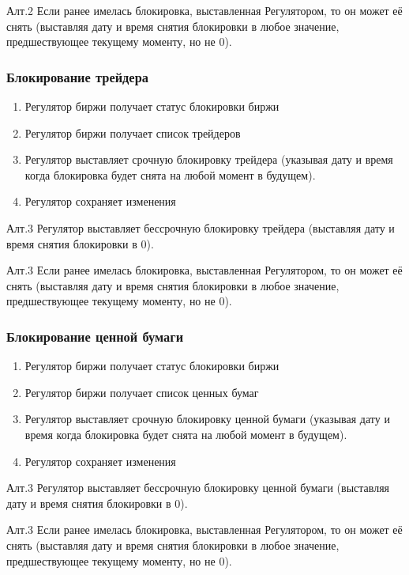\documentclass[a4paper, 12pt]{article}        %
\begin{document}
Алт.2 Если ранее имелась блокировка, выставленная Регулятором, то он может её снять (выставляя дату и время снятия блокировки в любое значение, предшествующее текущему моменту, но не 0).

\subsubsection{Блокирование трейдера}

\begin{enumerate}
\item Регулятор биржи получает статус блокировки биржи
\item Регулятор биржи получает список трейдеров
\item Регулятор выставляет срочную блокировку трейдера (указывая дату и время когда блокировка будет снята на любой момент в будущем).
\item Регулятор сохраняет изменения
\end{enumerate}

Алт.3 Регулятор выставляет бессрочную блокировку трейдера (выставляя дату и время снятия блокировки в 0).

Алт.3 Если ранее имелась блокировка, выставленная Регулятором, то он может её снять (выставляя дату и время снятия блокировки в любое значение, предшествующее текущему моменту, но не 0).

\subsubsection{Блокирование ценной бумаги}

\begin{enumerate}
\item Регулятор биржи получает статус блокировки биржи
\item Регулятор биржи получает список ценных бумаг
\item Регулятор выставляет срочную блокировку ценной бумаги (указывая дату и время когда блокировка будет снята на любой момент в будущем).
\item Регулятор сохраняет изменения
\end{enumerate}

Алт.3 Регулятор выставляет бессрочную блокировку ценной бумаги (выставляя дату и время снятия блокировки в 0).

Алт.3 Если ранее имелась блокировка, выставленная Регулятором, то он может её снять (выставляя дату и время снятия блокировки в любое значение, предшествующее текущему моменту, но не 0).
\end{document}
